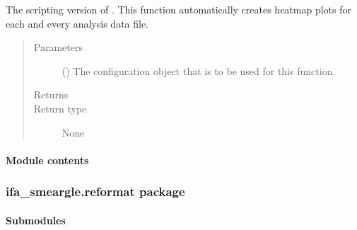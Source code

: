 \documentclass[letterpaper,10pt,english]{sphinxmanual}
\begin{document}
\begin{fulllineitems}
\label{\detokenize{docstrings/ifa_smeargle.plotting.histogram:ifa_smeargle.plotting.histogram.script_plot_gaussian_histogram}}
The scripting version of . This
function automatically creates heat\sphinxhyphen{}map plots for each and
every analysis data file.
\begin{quote}\begin{description}
\item[{Parameters}] \leavevmode
{} () \textendash{} The configuration object that is to be used for this
function.

\item[{Returns}] \leavevmode


\item[{Return type}] \leavevmode
None

\end{description}\end{quote}

\end{fulllineitems}



\paragraph{Module contents}
\label{\detokenize{docstrings/ifa_smeargle.plotting:module-ifa_smeargle.plotting}}\label{\detokenize{docstrings/ifa_smeargle.plotting:module-contents}}

\subsubsection{ifa\_smeargle.reformat package}
\label{\detokenize{docstrings/ifa_smeargle.reformat:ifa-smeargle-reformat-package}}\label{\detokenize{docstrings/ifa_smeargle.reformat::doc}}

\paragraph{Submodules}
\label{\detokenize{docstrings/ifa_smeargle.reformat:submodules}}
\end{document}
